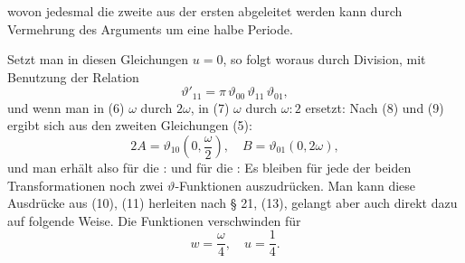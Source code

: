 wovon jedesmal die zweite aus der ersten abgeleitet werden kann durch Vermehrung des Arguments um eine halbe Periode.

Setzt man in diesen Gleichungen $u = 0$, so folgt
woraus durch Division, mit Benutzung der Relation
\[
\vartheta'_{11} = \pi\,\vartheta_{00}\,\vartheta_{11}\,\vartheta_{01},
\]
und wenn man in (6) $\omega$ durch $2\omega$, in (7) $\omega$ durch $\omega{:}2$ ersetzt:
Nach (8) und (9) ergibt sich aus den zweiten Gleichungen (5):
\[
2A = \vartheta_{10}\left(0, \frac{\omega}{2}\right), \quad B = \vartheta_{01}(0, 2\omega),
\]
und man erhält also für die :
und für die :
Es bleiben für jede der beiden Transformationen noch zwei $\vartheta$-Funktionen auszudrücken. Man kann diese Ausdrücke aus (10), (11) herleiten nach § 21, (13), gelangt aber auch direkt dazu auf folgende Weise. Die Funktionen
verschwinden für
\[
w = \frac{\omega}{4}, \quad u = \frac{1}{4}.
\]
